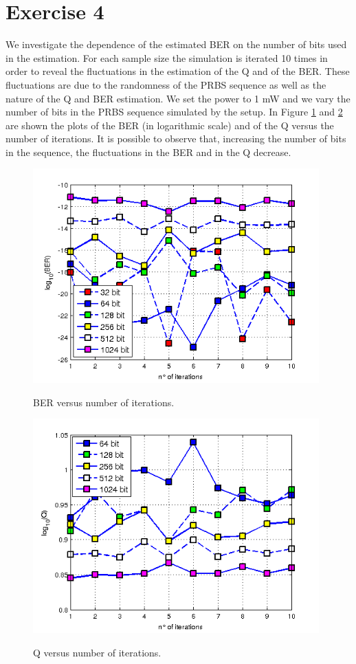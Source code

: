 \documentclass[a4paper,10pt]{report}
\begin{document}
\newpage
\section*{Exercise 4}
We investigate the dependence of the estimated BER on the number of bits used in the estimation. For each sample size the simulation
is iterated 10 times in order to reveal the fluctuations in the estimation of the Q and of the BER. These fluctuations are due to the
randomness of the PRBS sequence as well as the nature of the Q and BER estimation.
We set the power to 1 mW and we vary the number of bits in the PRBS sequence simulated by the setup.
In Figure \ref{ex4_1} and \ref{ex4_2} are shown the plots of the BER (in logarithmic scale) and of the Q versus the number of iterations.
It is possible to observe that, increasing the number of bits in the sequence, the fluctuations in the BER and in the Q decrease.

\begin{figure}[!ht]
   \centering
   \includegraphics[width=11cm]{ex4_1.png}\\
   \caption{BER versus number of iterations.}
   \label{ex4_1}
\end{figure}

\begin{figure}[!ht]
   \centering
   \includegraphics[width=11cm]{ex4_2.png}\\
   \caption{Q versus number of iterations.}
   \label{ex4_2}
\end{figure}
\end{document}
